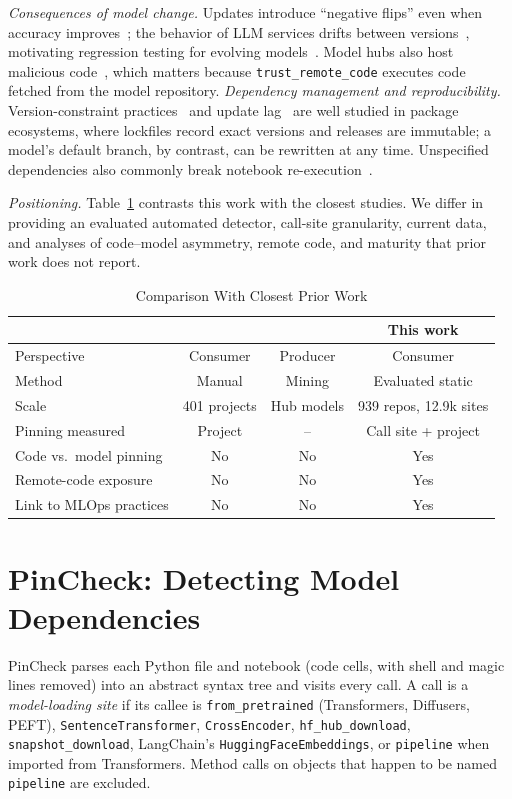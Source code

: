 \documentclass[conference]{IEEEtran}
\begin{document}
\textit{Consequences of model change.} Updates introduce ``negative flips'' even when accuracy improves~\cite{xie2021}; the behavior of LLM services drifts between versions~\cite{chen2024chatgpt}, motivating regression testing for evolving models~\cite{ma2024}. Model hubs also host malicious code~\cite{zhao2024}, which matters because \texttt{trust\_remote\_code} executes code fetched from the model repository. \textit{Dependency management and reproducibility.} Version-constraint practices~\cite{decan2021} and update lag~\cite{kula2018} are well studied in package ecosystems, where lockfiles record exact versions and releases are immutable; a model's default branch, by contrast, can be rewritten at any time. Unspecified dependencies also commonly break notebook re-execution~\cite{pimentel2019}.

\textit{Positioning.} Table~\ref{tab:prior} contrasts this work with the closest studies. We differ in providing an evaluated automated detector, call-site granularity, current data, and analyses of code--model asymmetry, remote code, and maturity that prior work does not report.

\begin{table}[t]
\centering
\caption{Comparison With Closest Prior Work}
\label{tab:prior}
\footnotesize
\setlength{\tabcolsep}{2.5pt}
\begin{tabular}{@{}lccc@{}}
\toprule
 & \cite{yasmin2025} & \cite{ajibode2025,castano2024} & \textbf{This work} \\
\midrule
Perspective & Consumer & Producer & Consumer \\
Method & Manual & Mining & Evaluated static \\
Scale & 401 projects & Hub models & 939 repos, 12.9k sites \\
Pinning measured & Project & -- & Call site + project \\
Code vs.\ model pinning & No & No & Yes \\
Remote-code exposure & No & No & Yes \\
Link to MLOps practices & No & No & Yes \\
\bottomrule
\end{tabular}
\end{table}

\section{PinCheck: Detecting Model Dependencies}
PinCheck parses each Python file and notebook (code cells, with shell and magic lines removed) into an abstract syntax tree and visits every call. A call is a \emph{model-loading site} if its callee is \texttt{from\_pretrained} (Transformers, Diffusers, PEFT), \texttt{SentenceTransformer}, \texttt{CrossEncoder}, \texttt{hf\_hub\_download}, \texttt{snapshot\_download}, LangChain's \texttt{HuggingFaceEmbeddings}, or \texttt{pipeline} when imported from Transformers. Method calls on objects that happen to be named \texttt{pipeline} are excluded.
\end{document}
